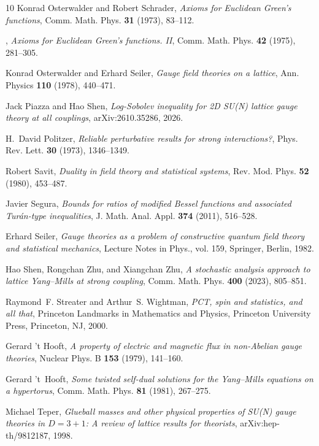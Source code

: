 \documentclass[11pt,a4paper]{amsart}
\theoremstyle{definition}
\theoremstyle{remark}
\numberwithin{equation}{section}
\begin{document}
\begin{thebibliography}{10}
Konrad Osterwalder and Robert Schrader, \emph{Axioms for {E}uclidean {G}reen's
  functions}, Comm. Math. Phys. \textbf{31} (1973), 83--112.

\bysame, \emph{Axioms for {E}uclidean {G}reen's functions. {II}}, Comm. Math.
  Phys. \textbf{42} (1975), 281--305.

Konrad Osterwalder and Erhard Seiler, \emph{Gauge field theories on a lattice},
  Ann. Physics \textbf{110} (1978), 440--471.

Jack Piazza and Hao Shen, \emph{Log-{S}obolev inequality for {2D} {SU(N)}
  lattice gauge theory at all couplings}, arXiv:2610.35286, 2026.

H.~David Politzer, \emph{Reliable perturbative results for strong
  interactions?}, Phys. Rev. Lett. \textbf{30} (1973), 1346--1349.

Robert Savit, \emph{Duality in field theory and statistical systems}, Rev. Mod.
  Phys. \textbf{52} (1980), 453--487.

Javier Segura, \emph{Bounds for ratios of modified {B}essel functions and
  associated {T}ur{\'a}n-type inequalities}, J. Math. Anal. Appl. \textbf{374}
  (2011), 516--528.

Erhard Seiler, \emph{Gauge theories as a problem of constructive quantum field
  theory and statistical mechanics}, Lecture Notes in Phys., vol. 159,
  Springer, Berlin, 1982.

Hao Shen, Rongchan Zhu, and Xiangchan Zhu, \emph{A stochastic analysis approach
  to lattice {Y}ang--{M}ills at strong coupling}, Comm. Math. Phys.
  \textbf{400} (2023), 805--851.

Raymond~F. Streater and Arthur~S. Wightman, \emph{{PCT}, spin and statistics,
  and all that}, Princeton Landmarks in Mathematics and Physics, Princeton
  University Press, Princeton, NJ, 2000.

Gerard {'t Hooft}, \emph{A property of electric and magnetic flux in
  non-{A}belian gauge theories}, Nuclear Phys. B \textbf{153} (1979), 141--160.

Gerard 't~Hooft, \emph{Some twisted self-dual solutions for the {Y}ang--{M}ills
  equations on a hypertorus}, Comm. Math. Phys. \textbf{81} (1981), 267--275.

Michael Teper, \emph{Glueball masses and other physical properties of {SU(N)}
  gauge theories in {$D=3+1$}: A review of lattice results for theorists},
  arXiv:hep-th/9812187, 1998.


\end{thebibliography}
\end{document}
